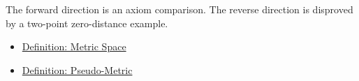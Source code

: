 \begin{remark*}
The forward direction is an axiom comparison.  The reverse direction is
disproved by a two-point zero-distance example.
\end{remark*}

\begin{dependencies}
\begin{itemize}
  \item \hyperref[def:metric-space]{Definition: Metric Space}
  \item \hyperref[def:pseudo-metric]{Definition: Pseudo-Metric}
\end{itemize}
\end{dependencies}

\clearpage
